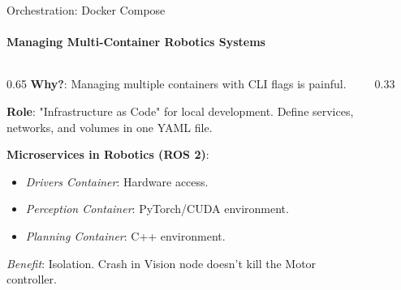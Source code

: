 \documentclass[aspectratio=169]{beamer}
\begin{document}
\begin{frame}[t]{Orchestration: Docker Compose}
    \framesubtitle{Managing Multi-Container Robotics Systems}
    \vspace*{-0.5cm}
    \begin{columns}[T,onlytextwidth]
        \begin{column}{0.65\textwidth}
            \textbf{Why?}: Managing multiple containers with CLI flags is painful.
            
            \textbf{Role}: "Infrastructure as Code" for local development. Define services, networks, and volumes in one YAML file.
            
            \textbf{Microservices in Robotics (ROS 2)}:
            \begin{itemize}
                \item \textit{Drivers Container}: Hardware access.
                \item \textit{Perception Container}: PyTorch/CUDA environment.
                \item \textit{Planning Container}: C++ environment.
            \end{itemize}
            \textit{Benefit}: Isolation. Crash in Vision node doesn't kill the Motor controller.
        \end{column}
        \begin{column}{0.33\textwidth}
            \vspace*{-1.5cm}
            \begin{figure}[H]
                \centering
            \end{figure}
        \end{column}
    \end{columns}
\end{frame}
\end{document}
